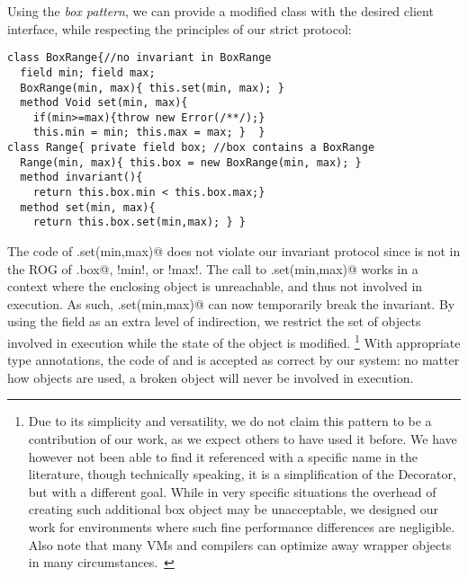 Using the \emph{box pattern}, we can provide a modified
\Q@Range@ class with the desired client interface, while respecting the principles of our strict protocol:
\begin{lstlisting}
class BoxRange{//no invariant in BoxRange
  field min; field max;
  BoxRange(min, max){ this.set(min, max); }
  method Void set(min, max){
    if(min>=max){throw new Error(/**/);}
    this.min = min; this.max = max; }  }
class Range{ private field box; //box contains a BoxRange
  Range(min, max){ this.box = new BoxRange(min, max); }
  method invariant(){
    return this.box.min < this.box.max;}
  method set(min, max){
    return this.box.set(min,max); } }
\end{lstlisting}
The code of \Q@Range.set(min,max)@ does not violate our invariant protocol since \Q@this@ is not in the ROG of \Q@this.box@, \Q!min!, or \Q!max!. The call to
\Q@BoxRange.set(min,max)@ works in a context where the enclosing \Q@Range@ object is
unreachable, and thus not involved in execution. As such, \Q@Range.set(min,max)@ can now temporarily break the \Q@Range@ invariant.
By using the \Q@box@ field as an extra level of indirection, we restrict the set of objects involved in execution while the state of the object \Q@Range@ is modified.%
\footnote{Due to its simplicity and versatility, we do not claim this pattern to be a contribution of our work, as we expect others to have used it before. We have however not been able to find it referenced with a specific name in the literature, though technically speaking, it is a simplification of the Decorator, but with a different goal.
While in very specific situations the overhead of creating such additional box object may be unacceptable, we designed our work for environments where such fine performance differences are negligible.
Also note that many VMs and compilers can optimize away wrapper objects in many circumstances.~\cite{Bolz:2011:ARP:1929501.1929508}}
With appropriate type annotations, the code of \Q@Range@ and \Q@BoxRange@ is accepted as correct by our system: no matter how \Q@Range@ objects are used, a broken \Q@Range@ object will never be involved in execution.

